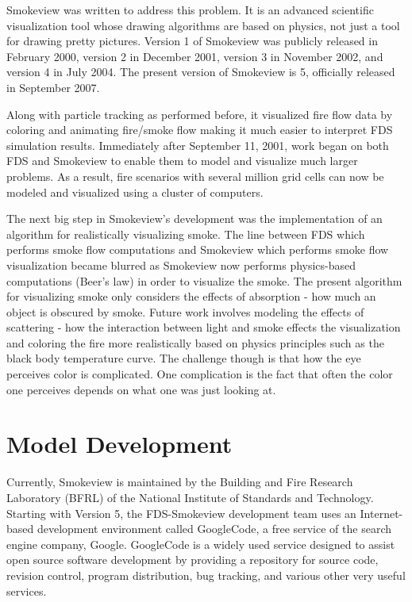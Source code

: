 \documentclass[11pt,twoside]{book}
\begin{document}
Smokeview was written to address this problem. It is an advanced scientific visualization tool whose drawing algorithms are based on physics, not just a tool for drawing pretty pictures.
Version 1 of Smokeview was publicly released in February 2000, version 2 in December 2001, version 3 in November 2002, and version 4 in July 2004.
The present version of Smokeview is 5, officially released in September 2007.

Along with particle tracking as performed before, it visualized fire flow data by coloring and animating fire/smoke flow making it much easier to interpret FDS simulation results.  Immediately after September 11, 2001, work began on both FDS and Smokeview to enable them to model and visualize much larger problems.  As a result, fire scenarios with several million grid cells can now be modeled and visualized using a cluster of computers.

The next big step in Smokeview's development was the implementation of an algorithm for realistically visualizing smoke.   The line between FDS which performs smoke flow computations and Smokeview which performs smoke flow visualization became blurred as Smokeview now performs physics-based computations (Beer's law) in order to visualize the smoke.  The present algorithm for visualizing smoke only considers the effects of absorption - how much an object is obscured by smoke.  Future work involves modeling the effects of scattering - how the interaction between light and smoke effects the visualization and coloring the fire more realistically based on physics principles such as the black body temperature curve.  The challenge though is that how the eye perceives color is complicated.  One complication is the fact that often the color one perceives depends on what one was just looking at.

\section{Model Development}
Currently, Smokeview is maintained by the Building and Fire Research Laboratory (BFRL) of the National Institute of Standards and Technology.
Starting with Version 5, the FDS-Smokeview development team uses an Internet-based development environment called GoogleCode, a free service of the search
engine company, Google. GoogleCode is a widely used service designed to assist open source software development by providing a repository for source
code, revision control, program distribution, bug tracking, and various other very useful services.
\end{document}
